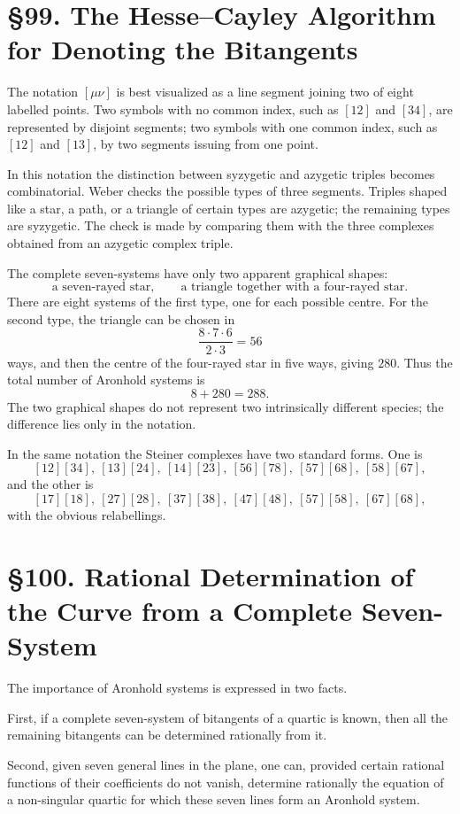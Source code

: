 \documentclass[11pt,a4paper]{book}
\newcommand{\webersection}[2]{\clearpage\section*{\S #1. #2}}
\begin{document}
\webersection{99}{The Hesse--Cayley Algorithm for Denoting the Bitangents}

The notation \([\mu\nu]\) is best visualized as a line segment joining two of eight labelled points.  Two symbols with no common index, such as \([12]\) and \([34]\), are represented by disjoint segments; two symbols with one common index, such as \([12]\) and \([13]\), by two segments issuing from one point.

In this notation the distinction between syzygetic and azygetic triples becomes combinatorial.  Weber checks the possible types of three segments.  Triples shaped like a star, a path, or a triangle of certain types are azygetic; the remaining types are syzygetic.  The check is made by comparing them with the three complexes obtained from an azygetic complex triple.

The complete seven-systems have only two apparent graphical shapes:
\[
\text{a seven-rayed star},\qquad
\text{a triangle together with a four-rayed star}.
\]
There are eight systems of the first type, one for each possible centre.  For the second type, the triangle can be chosen in
\[
\frac{8\cdot7\cdot6}{2\cdot3}=56
\]
ways, and then the centre of the four-rayed star in five ways, giving \(280\).  Thus the total number of Aronhold systems is
\[
8+280=288.
\]
The two graphical shapes do not represent two intrinsically different species; the difference lies only in the notation.

In the same notation the Steiner complexes have two standard forms.  One is
\[
[12][34],\ [13][24],\ [14][23],\
[56][78],\ [57][68],\ [58][67],
\]
and the other is
\[
[17][18],\ [27][28],\ [37][38],\
[47][48],\ [57][58],\ [67][68],
\]
with the obvious relabellings.

\webersection{100}{Rational Determination of the Curve from a Complete Seven-System}

The importance of Aronhold systems is expressed in two facts.

First, if a complete seven-system of bitangents of a quartic is known, then all the remaining bitangents can be determined rationally from it.

Second, given seven general lines in the plane, one can, provided certain rational functions of their coefficients do not vanish, determine rationally the equation of a non-singular quartic for which these seven lines form an Aronhold system.
\end{document}
